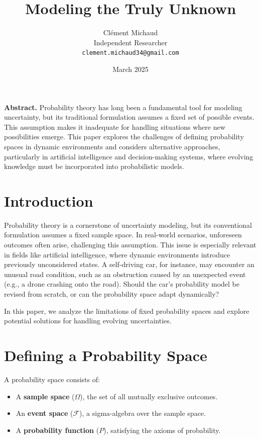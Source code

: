 \documentclass{article}
\title{Modeling the Truly Unknown}
\author{
Clément Michaud \\ Independent Researcher\\ \texttt{clement.michaud34@gmail.com}
}
\date{March 2025}
\begin{document}
\maketitle

\begin{center}
\begin{minipage}{0.9\textwidth}
\small
\textbf{Abstract.} Probability theory has long been a fundamental tool for modeling uncertainty, but its traditional formulation assumes a fixed set of possible events. This assumption makes it inadequate for handling situations where new possibilities emerge. This paper explores the challenges of defining probability spaces in dynamic environments and considers alternative approaches, particularly in artificial intelligence and decision-making systems, where evolving knowledge must be incorporated into probabilistic models.
\end{minipage}
\end{center}

\vspace{10pt}

\section{Introduction}
Probability theory is a cornerstone of uncertainty modeling, but its conventional formulation assumes a fixed sample space. In real-world scenarios, unforeseen outcomes often arise, challenging this assumption. This issue is especially relevant in fields like artificial intelligence, where dynamic environments introduce previously unconsidered states. A self-driving car, for instance, may encounter an unusual road condition, such as an obstruction caused by an unexpected event (e.g., a drone crashing onto the road). Should the car's probability model be revised from scratch, or can the probability space adapt dynamically?

In this paper, we analyze the limitations of fixed probability spaces and explore potential solutions for handling evolving uncertainties.

\section{Defining a Probability Space}
A probability space\cite{probability_space} consists of:

\begin{itemize}
\item A \textbf{sample space} ($\Omega$), the set of all mutually exclusive outcomes.
\item An \textbf{event space} ($\mathcal{F}$), a sigma-algebra over the sample space.
\item A \textbf{probability function} ($P$), satisfying the axioms of probability.
\end{itemize}
\end{document}
